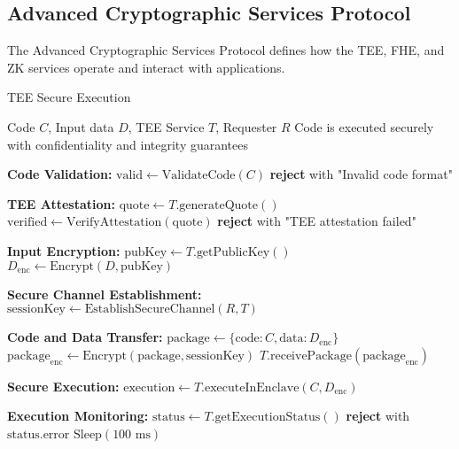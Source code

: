 \subsection{Advanced Cryptographic Services Protocol}
\label{subsec:advanced-crypto-protocol}

The Advanced Cryptographic Services Protocol defines how the TEE, FHE, and ZK services operate and interact with applications.

\begin{tcolorbox}[
    enhanced,
    colback=blue!5!white,
    colframe=blue!75!black,
    arc=5mm,
    boxrule=1.5pt,
    title=TEE Secure Execution Protocol,
    fonttitle=\bfseries,
    coltitle=white,
    attach boxed title to top left={yshift=-2mm, xshift=5mm},
    boxed title style={colback=blue!75!black, rounded corners},
    shadow={2mm}{-2mm}{0mm}{black!50},
    drop fuzzy shadow
]
\begin{protocol}{TEE Secure Execution}
\label{prot:tee-execution}
\begin{algorithmic}[1]
\Require Code $C$, Input data $D$, TEE Service $T$, Requester $R$
\Ensure Code is executed securely with confidentiality and integrity guarantees

\State \textbf{Code Validation:}
\State $\text{valid} \gets \text{ValidateCode}(C)$
    \State \textbf{reject} with "Invalid code format"
\EndIf

\State \textbf{TEE Attestation:}
\State $\text{quote} \gets T.\text{generateQuote}()$
\State $\text{verified} \gets \text{VerifyAttestation}(\text{quote})$
    \State \textbf{reject} with "TEE attestation failed"
\EndIf

\State \textbf{Input Encryption:}
\State $\text{pubKey} \gets T.\text{getPublicKey}()$
\State $D_{\text{enc}} \gets \text{Encrypt}(D, \text{pubKey})$

\State \textbf{Secure Channel Establishment:}
\State $\text{sessionKey} \gets \text{EstablishSecureChannel}(R, T)$

\State \textbf{Code and Data Transfer:}
\State $\text{package} \gets \{\text{code}: C, \text{data}: D_{\text{enc}}\}$
\State $\text{package}_{\text{enc}} \gets \text{Encrypt}(\text{package}, \text{sessionKey})$
\State $T.\text{receivePackage}(\text{package}_{\text{enc}})$

\State \textbf{Secure Execution:}
\State $\text{execution} \gets T.\text{executeInEnclave}(C, D_{\text{enc}})$

\State \textbf{Execution Monitoring:}
    \State $\text{status} \gets T.\text{getExecutionStatus}()$
        \State \textbf{reject} with $\text{status}.\text{error}$
    \EndIf
    \State $\text{Sleep}(100\text{ ms})$
\EndWhile


\end{algorithmic}
\end{protocol}
\end{tcolorbox}
